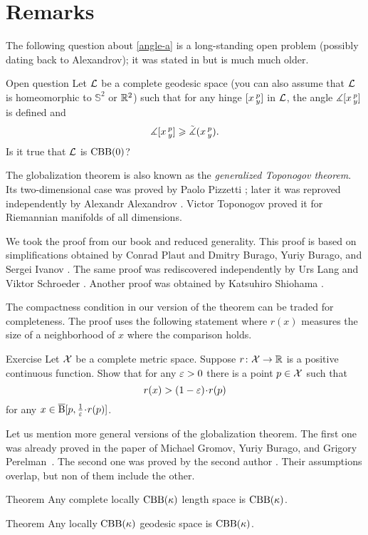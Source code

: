\section{Remarks}

The following question about \ref{angle-a} is a long-standing open problem (possibly dating back to Alexandrov);
it was stated in \cite[footnote in 4.1.5]{burago-burago-ivanov} but is much much older.

\begin{thm}{Open question}\label{open:hinge-}
Let $\mathcal{L}$ be a complete geodesic space (you can also assume that $\mathcal{L}$ is homeomorphic to $\mathbb{S}^2$ or $\mathbb{R}^2$) 
such that for any hinge $[x\,{}^{p}_{y}]$ in $\mathcal{L}$, 
the angle $\measuredangle[x\,{}^{p}_{y}]$ is defined and 
\[\measuredangle[x\,{}^{p}_{y}]\geqslant\tilde\measuredangle(x\,{}^{p}_{y}).\]
Is it true that $\mathcal{L}$ is $\mathrm{CBB}(0)$?
\end{thm}

The globalization theorem is also known as the \textit{generalized Toponogov theorem}.
Its two-dimensional case was proved by Paolo Pizzetti \cite{pizzetti};
later it was reproved independently by Alexandr Alexandrov \cite{alexandrov:devel}. %
Victor Toponogov \cite{toponogov-globalization+splitting} proved it for Riemannian manifolds of all dimensions.

We took the proof from our book \cite{alexander-kapovitch-petrunin2024} and reduced generality.
This proof is based on simplifications obtained by Conrad Plaut \cite{plaut:dimension} and Dmitry Burago, Yuriy Burago, and Sergei Ivanov \cite{burago-burago-ivanov}.
The same proof was rediscovered independently by Urs Lang and Viktor Schroeder \cite{lang-schroeder:globalization}.
Another proof was obtained by
Katsuhiro Shiohama \cite{shiohama}.

The compactness condition in our version of the theorem can be traded for completeness.
The proof uses the following statement where $r(x)$ measures the size of a neighborhood of $x$ where the comparison holds.

\begin{thm}{Exercise}\label{ex:alm-min}
Let $\mathcal{X}$ be a complete metric space.
Suppose $r\colon\mathcal{X}\to \mathbb{R}$ is a positive continuous function.
Show that for any $\varepsilon>0$ there is a point $p\in \mathcal{X}$ such that 
\[r(x)> (1-\eps)\cdot r(p)\] 
for any $x\in \cBall[p,\tfrac{1}{\eps}\cdot r(p)]$.

\end{thm}

Let us mention more general versions of the globalization theorem.
The first one was already proved in the paper of Michael Gromov, Yuriy Burago, and Grigory Perelman~\cite{burago-gromov-perelman}.
The second one was proved by the second author \cite{petrunin:globalization}.
Their assumptions overlap, but non of them include the other.

\begin{thm}{Theorem}
Any complete locally $\mathrm{CBB}(\kappa)$ length space is $\mathrm{CBB}(\kappa)$.

\end{thm}

\begin{thm}{Theorem}\label{ex:noncomplete-globalization}
Any locally $\mathrm{CBB}(\kappa)$ geodesic space is $\mathrm{CBB}(\kappa)$.

\end{thm}




